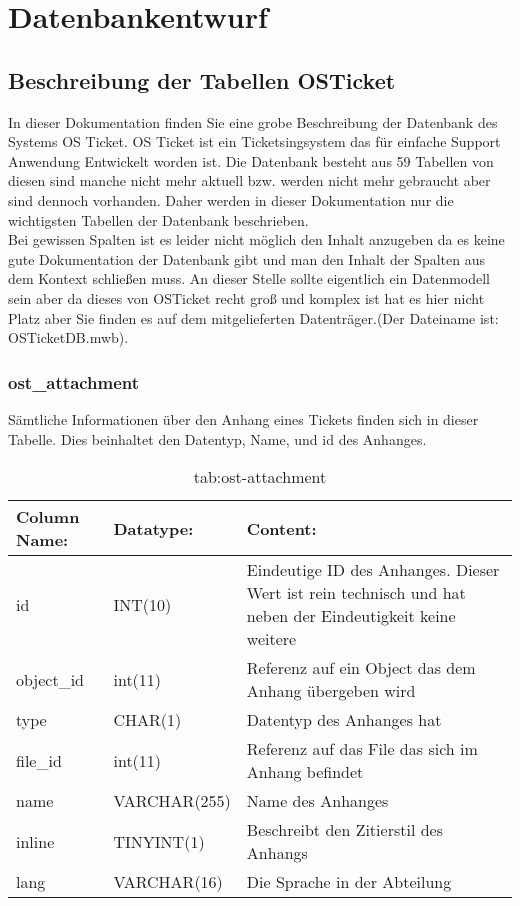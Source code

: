 \newpage
\section{Datenbankentwurf}
\def \currentAuthor{Elias Gabl}

\subsection{Beschreibung der Tabellen OSTicket}

In dieser Dokumentation finden Sie eine grobe Beschreibung der Datenbank des Systems OS Ticket. OS Ticket ist ein Ticketsingsystem das für einfache Support Anwendung Entwickelt worden ist. Die Datenbank besteht aus 59 Tabellen von diesen sind manche nicht mehr aktuell bzw. werden nicht mehr gebraucht aber sind dennoch vorhanden. Daher werden in dieser Dokumentation nur die wichtigsten Tabellen der Datenbank beschrieben.\\
Bei gewissen Spalten ist es leider nicht möglich den Inhalt anzugeben da es keine gute Dokumentation der Datenbank gibt und man den Inhalt der Spalten aus dem Kontext schließen muss.
\newline
\newline
An dieser Stelle sollte eigentlich ein Datenmodell sein aber da dieses von OSTicket recht groß und komplex ist hat es hier nicht Platz aber Sie finden es auf dem mitgelieferten Datenträger.(Der Dateiname ist: OSTicketDB.mwb).

\subsubsection{ost\_attachment}

Sämtliche Informationen über den Anhang eines Tickets finden sich in dieser Tabelle. Dies beinhaltet den Datentyp, Name, und id des Anhanges. 

\begin{table}[h]
	\begin{tabular}{|p{3.5cm}|p{4cm}|p{6.2cm}|}
		\hline
		\textbf{Column Name:} & \textbf{Datatype:} & \textbf{Content:} \\
		\hline
		id & INT(10) & Eindeutige ID des Anhanges. Dieser Wert ist rein technisch und hat  neben der Eindeutigkeit keine weitere  \\
		\hline
		object\_id & int(11) & Referenz auf ein Object das dem Anhang übergeben wird \\
		\hline
		type & CHAR(1) & Datentyp des Anhanges hat \\
		\hline
		file\_id & int(11) & Referenz auf das File das sich im Anhang befindet\\
		\hline
		name & VARCHAR(255) & Name des Anhanges \\
		\hline
		inline & TINYINT(1) & Beschreibt den Zitierstil des Anhangs \\
		\hline
		lang & VARCHAR(16) & Die Sprache in der Abteilung \\
		\hline
	\end{tabular}
	\caption{tab:ost-attachment}
\end{table}
\label{tab:ost_attachment}

